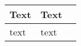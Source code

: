 \documentclass{article}
\begin{document}
\begin{table}[ht]
\begin{tabular}{|M{4cm}|M{4cm}|N}
\hline
\textbf{Text} & \textbf{Text} &\\[50pt]
\hline
text & text&\\[50pt]
\hline
\end{tabular}
\end{table}
\end{document}

